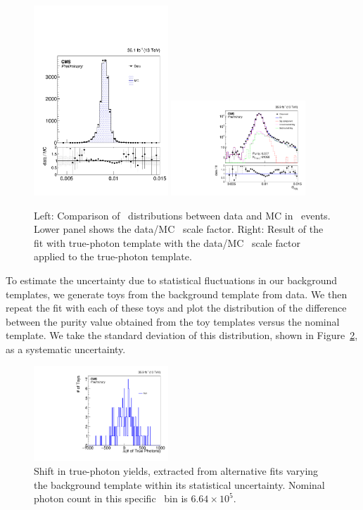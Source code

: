 \begin{figure}[htbp]
  \centering
  \includegraphics[width=0.45\textwidth]{Calibration/Figures/pvsf/sieie_ratio.pdf}
  \includegraphics[width=0.45\textwidth]{Calibration/Figures/pvsf/ssfit_400_medium_shape_logy.pdf}
  \caption{
    Left: Comparison of \sieie\ distributions between data and MC in \Zee\ events. 
    Lower panel shows the data/MC \sieie\ scale factor.
    Right: Result of the fit with true-photon template with the data/MC \sieie\ scale factor applied to the true-photon template.
  }
  \label{fig:impurity-sieie}
\end{figure}

To estimate the uncertainty due to statistical fluctuations in our background templates, we generate toys from the background template from data. 
We then repeat the fit with each of these toys and plot the distribution of the difference between the purity value obtained from the toy templates versus the nominal template. 
We take the standard deviation of this distribution, shown in Figure~\ref{fig:impurity-toys}, as a systematic uncertainty.

\begin{figure}[htbp]
  \centering
  \includegraphics[width=0.45\textwidth]{Calibration/Figures/pvsf/ssfit_175_medium-pixel-monoph_toyyield_dist.pdf}
  \caption{
    Shift in true-photon yields, extracted from alternative fits varying the background template within its statistical uncertainty. 
    Nominal photon count in this specific \ETg\ bin is $6.64\times 10^{5}$.
  }
  \label{fig:impurity-toys}
\end{figure}


